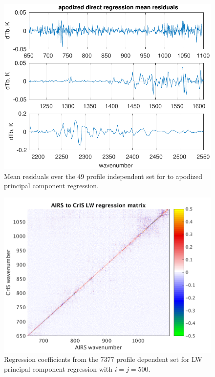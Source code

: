 \documentclass[10pt,twocolumn]{article}
\begin{document}
\begin{figure} %
  \centering
  \includegraphics[width=\linewidth]{figures/ap_pc_regr.pdf}
  \caption{Mean residuals over the 49 profile independent set for
    {\airs} to apodized {\cris} principal component regression.}
  \label{dreg6}
\end{figure}

\begin{figure} %
  \centering
  \includegraphics[width=\linewidth]{figures/LW_pc_regr_mat.png}
  \caption{Regression coefficients from the 7377 profile dependent
    set for LW principal component regression with $i = j = 500$.}
  \label{dreg7}
\end{figure}
\end{document}
